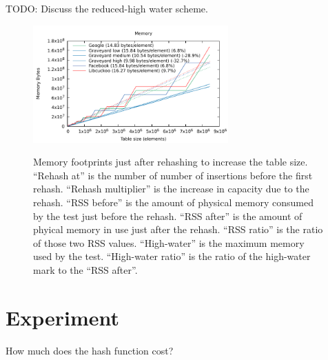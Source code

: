 \documentclass[10pt]{article}
\theoremstyle{remark}
\theoremstyle{remark}
\newcommand{\figlabel}[1]{\label{fig:#1}}
\begin{document}
TODO: Discuss the reduced-high water scheme.

\begin{figure}
\begin{center}
    \includegraphics[width=75mm]{experiments/library-memory} \\
\end{center}


\caption{Memory footprints just after rehashing to increase the table
  size.  ``Rehash at'' is the number of number of insertions before
  the first rehash.  ``Rehash multiplier'' is the increase in capacity
  due to the rehash.  ``RSS before'' is the amount of physical memory
  consumed by the test just before the rehash.  ``RSS after'' is the
  amount of phyical memory in use just after the rehash.  ``RSS
  ratio'' is the ratio of those two RSS values.  ``High-water'' is the
  maximum memory used by the test.  ``High-water ratio'' is the ratio
  of the high-water mark to the ``RSS after''.}  \figlabel{rss}
\end{figure}

\section{Experiment}

How much does the hash function cost?




\end{document}
